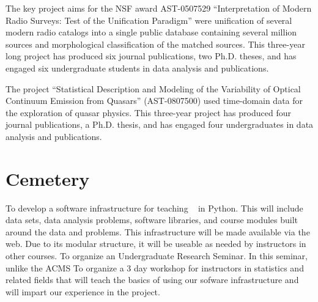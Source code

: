 The key project aims for the NSF award AST-0507529 ``Interpretation of Modern Radio 
Surveys: Test of the Unification Paradigm'' were unification of several modern radio 
catalogs into a single public database containing several million sources and 
morphological classification of the matched sources. This three-year long project has 
produced six journal publications, two Ph.D. theses, and has engaged six undergraduate 
students in data analysis and publications. 

The project ``Statistical Description and Modeling of the Variability of Optical Continuum 
Emission from Quasars'' (AST-0807500) used time-domain data for the exploration of quasar 
physics. This three-year project has produced four journal publications, a Ph.D. thesis, and has 
engaged four undergraduates in data analysis and publications. 


\section{Cemetery}

To develop a software infrastructure for teaching \cdse~ in
  Python. This will include data sets, data analysis problems,
  software libraries, and course modules built around the data and
  problems. This infrastructure will be made available via the
  web. Due to its modular structure, it will be useable as needed by
  instructors in other courses.
 To organize an Undergraduate Research Seminar. In this seminar, unlike the ACMS 
 To organize a 3 day workshop for instructors in statistics and related fields that will teach the basics of using our sofware infrastructure and will impart our experience in the project.



